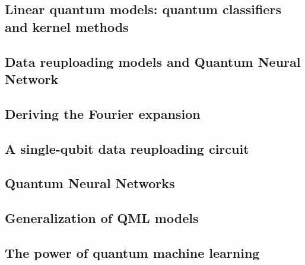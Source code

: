 \subsection{Linear quantum models: quantum classifiers and kernel methods}

\subsection{Data reuploading models and Quantum Neural Network}

\subsection{Deriving the Fourier expansion}

\subsection{A single-qubit data reuploading circuit}

\subsection{Quantum Neural Networks}

\subsection{Generalization of QML models}

\subsection{The power of quantum machine learning}







